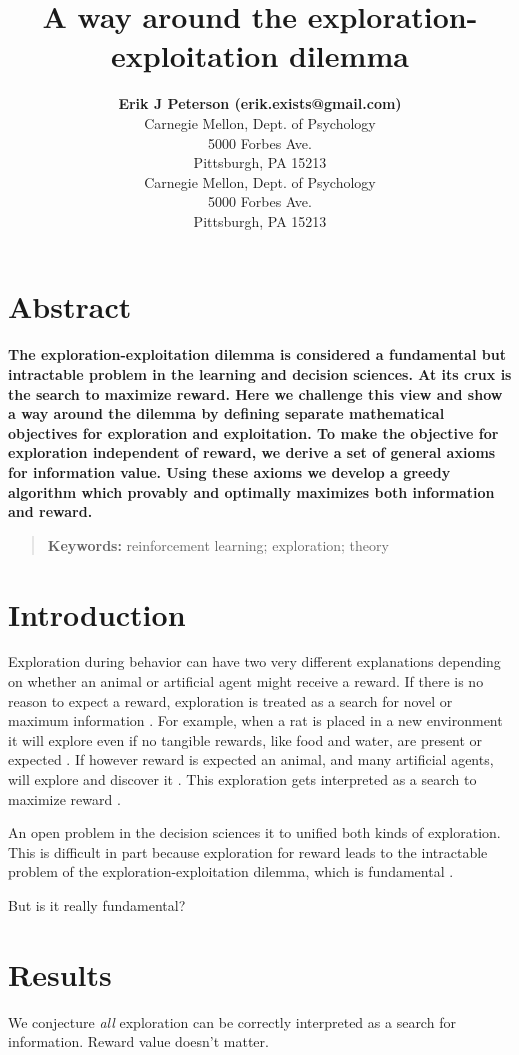 \documentclass[10pt,letterpaper]{article}
\title{A way around the exploration-exploitation dilemma}
\author{{\large \bf Erik J Peterson (erik.exists@gmail.com)} \\
  Carnegie Mellon, Dept. of Psychology\\
  5000 Forbes Ave. \\
  Pittsburgh, PA 15213
 \AND {\large \bf Timothy Verstynen (timothyv@andrew.cmu.edu)} \\
  Carnegie Mellon, Dept. of Psychology\\
  5000 Forbes Ave. \\
  Pittsburgh, PA 15213
}
\begin{document}
\maketitle

\section{Abstract}
{
\bf
    The exploration-exploitation dilemma is considered a fundamental but intractable problem in the learning and decision sciences. At its crux is the search to maximize reward. Here we challenge this view and show a way around the dilemma by defining separate mathematical objectives for exploration and exploitation. To make the objective for exploration independent of reward, we derive a set of general axioms for information value. Using these axioms we develop a greedy algorithm which provably and optimally maximizes both information and reward. 
}
\begin{quote}
\small
\textbf{Keywords:} 
reinforcement learning; exploration; theory
\end{quote}

\section{Introduction}
Exploration during behavior can have two very different explanations depending on whether an animal or artificial agent might receive a reward. If there is no reason to expect a reward, exploration is treated as a search for novel or maximum information \cite{Mehlhorn2015}. For example, when a rat is placed in a new environment it will explore even if no tangible rewards, like food and water, are present or expected \cite{Liu2019,Mehlhorn2015}. If however reward is expected an animal, and many artificial agents, will explore and discover it \cite{Mehlhorn2015}. This exploration gets interpreted as a search to maximize reward \cite{Sutton2018}. 

An open problem in the decision sciences it to unified both kinds of exploration. This is difficult in part because exploration for reward leads to the intractable problem of the exploration-exploitation dilemma, which is fundamental \cite{Thrun1992,Dayan1996,Findling2018,Gershman2018a}. 

But is it really fundamental?

\section{Results}
We conjecture \textit{all} exploration can be correctly interpreted as a search for information. Reward value doesn't matter. 
\end{document}
